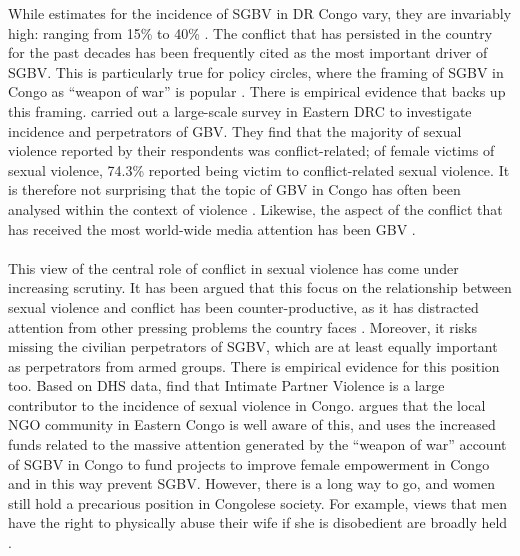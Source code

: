 \documentclass[11pt,a4paper]{scrartcl} %
\begin{document}
While estimates for the incidence of SGBV in DR Congo vary, they are invariably high: ranging from 15\% to 40\% \citep{Johnson2010,Peterman2011}. The conflict that has persisted in the country for the past decades has been frequently cited as the most important driver of SGBV. This is particularly true for policy circles, where the framing of SGBV in Congo as ``weapon of war'' is popular \citep{Baaz2013,Kirby2015}. There is empirical evidence that backs up this framing. \cite{Johnson2010} carried out a large-scale survey in Eastern DRC to investigate incidence and perpetrators of GBV. They find that the majority of sexual violence reported by their respondents was conflict-related; of female victims of sexual violence, 74.3\% reported being victim to conflict-related sexual violence. It is therefore not surprising that the topic of GBV in Congo has often been analysed within the context of violence \citep{Baaz2013}. Likewise, the aspect of the conflict that has received the most world-wide media attention has been GBV \citep{Autesserre2012a}.  
\paragraph{}
This view of the central role of conflict in sexual violence has come under increasing scrutiny. It has been argued that this focus on the relationship between sexual violence and conflict has been counter-productive, as it has distracted attention from other pressing problems the country faces \citep{Autesserre2012a, Hilhorst2018,Porter2019}. Moreover, it risks missing the civilian perpetrators of SGBV, which are at least equally important as perpetrators from armed groups. There is empirical evidence for this position too. Based on DHS data, \cite{Peterman2011} find that Intimate Partner Violence is a large contributor to the incidence of sexual violence in Congo. \cite{Hilhorst2018} argues that the local NGO community in Eastern Congo is well aware of this, and uses the increased funds related to the massive attention generated by the ``weapon of war'' account of SGBV in Congo to fund projects to improve female empowerment in Congo and in this way prevent SGBV.  However, there is a long way to go, and women still hold a precarious position in Congolese society. For example, views that men have the right to physically abuse their wife if she is disobedient are broadly held \citep{Quattrochi2019}.
\end{document}
